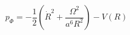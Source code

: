 \begin{equation}\label{p11}
p_{\Phi}=-\frac{1}{2}(\dot{R}^{2}+\frac{\Omega^{2}}{a^{6}R^{2}})-V(R)
\end{equation}

